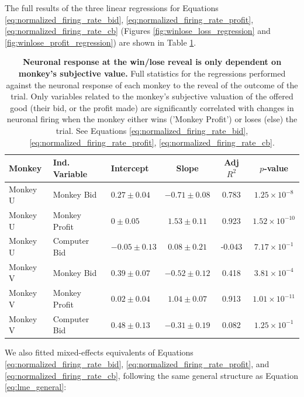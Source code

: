 The full results of the three linear regressions for Equations \ref{eq:normalized_firing_rate_bid}, \ref{eq:normalized_firing_rate_profit}, \ref{eq:normalized_firing_rate_cb} (Figures \ref{fig:winlose_loss_regression} and \ref{fig:winlose_profit_regression}) are shown in Table \ref{tab:wl_regression_results}.

\begin{table}[htbp]
\centering
\begin{tabular}{lllccc}
\hline
\textbf{Monkey} & \textbf{Ind. Variable} & \textbf{Intercept} & \textbf{Slope} & \textbf{Adj} $R^2$ & $p$\textbf{-value} \\
\hline
Monkey U & Monkey Bid & $0.27 \pm 0.04$ & $-0.71 \pm 0.08$ & 0.783 & $1.25 \times 10^{-8}$ \\
Monkey U & Monkey Profit & $0 \pm 0.05$ & $1.53 \pm 0.11$ & 0.923 & $1.52 \times 10^{-10}$ \\
Monkey U & Computer Bid & $-0.05 \pm 0.13$ & $0.08 \pm 0.21$ & -0.043 & $7.17 \times 10^{-1}$ \\
\hline
Monkey V & Monkey Bid & $0.39 \pm 0.07$ & $-0.52 \pm 0.12$ & 0.418 & $3.81 \times 10^{-4}$ \\
Monkey V & Monkey Profit & $0.02 \pm 0.04$ & $1.04 \pm 0.07$ & 0.913 & $1.01 \times 10^{-11}$ \\
Monkey V & Computer Bid & $0.48 \pm 0.13$ & $-0.31 \pm 0.19$ & 0.082 & $1.25 \times 10^{-1}$ \\
\hline
\end{tabular}
\caption[Neuronal response at the win/lose reveal is only dependent on monkey's subjective value.]{\textbf{Neuronal response at the win/lose reveal is only dependent on monkey's subjective value.} Full statistics for the regressions performed against the neuronal response of each monkey to the reveal of the outcome of the trial. Only variables related to the monkey's subjective valuation of the offered good (their bid, or the profit made) are significantly correlated with changes in neuronal firing when the monkey either wins ('Monkey Profit') or loses (else) the trial. See Equations \ref{eq:normalized_firing_rate_bid}, \ref{eq:normalized_firing_rate_profit}, \ref{eq:normalized_firing_rate_cb}.}
\label{tab:wl_regression_results}
\end{table}

We also fitted mixed-effects equivalents of Equations \ref{eq:normalized_firing_rate_bid}, \ref{eq:normalized_firing_rate_profit}, and \ref{eq:normalized_firing_rate_cb}, following the same general structure as Equation \ref{eq:lme_general}:

